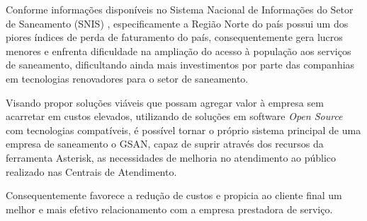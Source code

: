 Conforme informações disponíveis no Sistema Nacional de Informações do Setor de Saneamento (SNIS) \cite{SNIS:2014}, especificamente a Região Norte do país possui um dos piores índices de perda de faturamento do país, consequentemente gera lucros menores e enfrenta dificuldade na ampliação do acesso à população aos serviços de saneamento, dificultando ainda mais investimentos por parte das companhias em tecnologias renovadores para o setor de saneamento.
 
 Visando propor soluções viáveis que possam agregar valor à empresa sem acarretar em custos elevados, utilizando de soluções em software \textit{Open Source} com tecnologias compatíveis, é possível tornar o próprio sistema principal de uma empresa de saneamento o GSAN, capaz de suprir através dos recursos da ferramenta Asterisk, as necessidades de melhoria no atendimento ao público realizado nas Centrais de Atendimento.
 
 Consequentemente favorece a redução de custos e propicia ao cliente final um melhor e mais efetivo relacionamento com a empresa prestadora de serviço.
